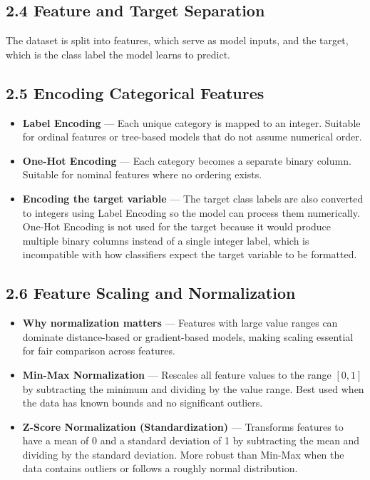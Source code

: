 \documentclass[12pt, a4paper]{article}
\begin{document}
\subsection*{2.4 Feature and Target Separation}
The dataset is split into features, which serve as model inputs, and the target, which is the class label the model learns to predict.

\subsection*{2.5 Encoding Categorical Features}
\begin{itemize}
    \item \textbf{Label Encoding} --- Each unique category is mapped to an integer. Suitable for ordinal features or tree-based models that do not assume numerical order.
    \item \textbf{One-Hot Encoding} --- Each category becomes a separate binary column. Suitable for nominal features where no ordering exists.
    \item \textbf{Encoding the target variable} --- The target class labels are also converted to integers using Label Encoding so the model can process them numerically. One-Hot Encoding is not used for the target because it would produce multiple binary columns instead of a single integer label, which is incompatible with how classifiers expect the target variable to be formatted.
\end{itemize}

\subsection*{2.6 Feature Scaling and Normalization}
\begin{itemize}
    \item \textbf{Why normalization matters} --- Features with large value ranges can dominate distance-based or gradient-based models, making scaling essential for fair comparison across features.
    \item \textbf{Min-Max Normalization} --- Rescales all feature values to the range $[0, 1]$ by subtracting the minimum and dividing by the value range. Best used when the data has known bounds and no significant outliers.
    \item \textbf{Z-Score Normalization (Standardization)} --- Transforms features to have a mean of 0 and a standard deviation of 1 by subtracting the mean and dividing by the standard deviation. More robust than Min-Max when the data contains outliers or follows a roughly normal distribution.
\end{itemize}
\end{document}

